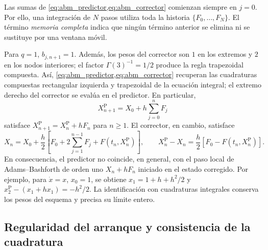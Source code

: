 Las sumas de \cref{eq:abm_predictor,eq:abm_corrector} comienzan siempre en
\(j=0\). Por ello, una integración de \(N\) pasos utiliza toda la historia
\(\{F_0,\ldots,F_N\}\). El término \emph{memoria completa} indica que ningún
término anterior se elimina ni se sustituye por una
ventana móvil.

\begin{remark}
Para \(q=1\), \(b_{j,n+1}=1\). Además, los pesos del corrector son \(1\) en
los extremos y \(2\) en los nodos interiores; el factor
\(\Gamma(3)^{-1}=1/2\) produce la regla trapezoidal compuesta. Así,
\cref{eq:abm_predictor,eq:abm_corrector} recuperan las cuadraturas compuestas
rectangular izquierda y trapezoidal de la ecuación integral; el extremo
derecho del corrector se evalúa en el predictor. En particular,
\[
 X_{n+1}^{\mathrm P}=X_0+h\sum_{j=0}^{n}F_j
\]
satisface \(X_{n+1}^{\mathrm P}=X_n^{\mathrm P}+hF_n\) para \(n\geq1\).
El corrector, en cambio, satisface
\[
 X_n=X_0+\frac h2\left[F_0+2\sum_{j=1}^{n-1}F_j
                    +F(t_n,X_n^{\mathrm P})\right],
 \qquad
 X_n^{\mathrm P}-X_n=\frac h2[F_0-F(t_n,X_n^{\mathrm P})].
\]
En consecuencia, el predictor no coincide, en general, con el paso local de
Adams--Bashforth de orden uno
\(X_n+hF_n\) iniciado en el estado corregido. Por ejemplo, para
\(\dot x=x\), \(x_0=1\), se obtiene \(x_1=1+h+h^2/2\) y
\(x_2^{\mathrm P}-(x_1+hx_1)=-h^2/2\). La identificación con cuadraturas
integrales conserva los pesos del esquema y precisa su límite entero.
\end{remark}

\subsection{Regularidad del arranque y consistencia de la cuadratura}
\label{subsec:numerical-startup-consistency}

